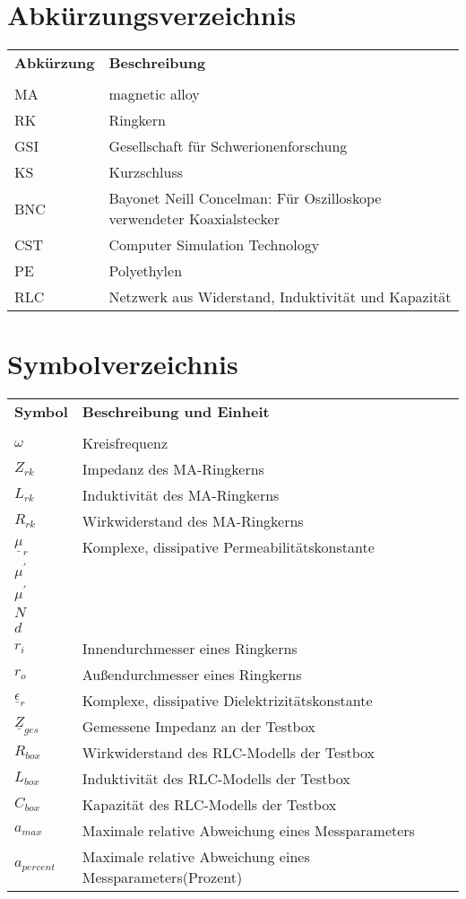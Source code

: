 \chapter*{Abk\"urzungsverzeichnis}
\begin{tabular}{p{} p{}}
\textbf{Abk\"urzung} & \textbf{Beschreibung} \\
 & \\
MA & magnetic alloy \\
RK & Ringkern \\
GSI & Gesellschaft f\"ur Schwerionenforschung \\
KS & Kurzschluss \\
BNC & Bayonet Neill Concelman: F\"ur Oszilloskope verwendeter Koaxialstecker \\
CST & Computer Simulation Technology \\
PE & Polyethylen \\
RLC & Netzwerk aus Widerstand, Induktivit\"at und Kapazit\"at \\
\end{tabular}

\cleardoublepage

\chapter*{Symbolverzeichnis}

\begin{tabular}{p{} p{}}
\textbf{Symbol} & \textbf{Beschreibung und Einheit}\\
 & \\
$\omega$ & Kreisfrequenz \\

$Z_{rk}$ & Impedanz des MA-Ringkerns \\
$L_{rk}$ & Induktivit\"at des MA-Ringkerns \\
$R_{rk}$ & Wirkwiderstand des MA-Ringkerns \\
$\underline{\mu}_r$ & Komplexe, dissipative Permeabilit\"atskonstante\\
$\mu^{\prime}$ & \\
$\mu^{\prime}$ & \\
$N$ & \\
$d$ & \\
$r_i$ & Innendurchmesser eines Ringkerns \\
$r_o$ & Au\ss{}endurchmesser eines Ringkerns \\
$\underline{\epsilon}_r$ & Komplexe, dissipative Dielektrizit\"atskonstante\\
$\underline{Z}_{ges}$ & Gemessene Impedanz an der Testbox \\
$R_{box}$ & Wirkwiderstand des RLC-Modells der Testbox \\
$L_{box}$ & Induktivit\"at des RLC-Modells der Testbox \\
$C_{box}$ & Kapazit\"at des RLC-Modells der Testbox \\
$a_{max}$ & Maximale relative Abweichung eines Messparameters \\
$a_{percent}$ & Maximale relative Abweichung eines Messparameters(Prozent) \\


\end{tabular}
